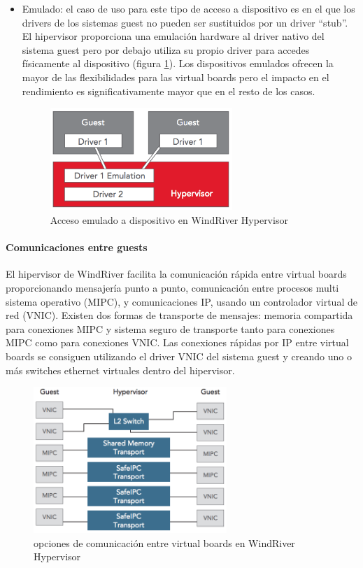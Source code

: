 \begin{itemize}
  \item Emulado: el caso de uso para este tipo de acceso a dispositivo es en el que los drivers de los sistemas guest no pueden ser sustituidos por un driver ``stub''. El hipervisor proporciona una emulación hardware al driver nativo del sistema guest pero por debajo utiliza su propio driver para accedes físicamente al dispositivo (figura \ref{fig:windriver_drv_3}). Los dispositivos emulados ofrecen la mayor de las flexibilidades para las virtual boards pero el impacto en el rendimiento es significativamente mayor que en el resto de los casos.
  \begin{figure}[!htb]
  	\centering
  	\includegraphics[width=0.65\textwidth]{recursos/windriver_drv_3.png}
  	\caption{Acceso emulado a dispositivo en WindRiver Hypervisor}
  	\label{fig:windriver_drv_3}
  \end{figure}

\end{itemize}

\paragraph{Comunicaciones entre guests}
El hipervisor de WindRiver facilita la comunicación rápida entre virtual boards proporcionando mensajería punto a punto, comunicación entre procesos multi sistema operativo (\acrshort{MIPC}), y comunicaciones IP, usando un controlador virtual de red (VNIC). Existen dos formas de transporte de mensajes: memoria compartida para conexiones \acrshort{MIPC} y sistema seguro de transporte tanto para conexiones \acrshort{MIPC} como para conexiones \acrshort{VNIC}. Las conexiones rápidas por IP entre virtual boards se consiguen utilizando el driver \acrshort{VNIC} del sistema guest y creando uno o más switches ethernet virtuales dentro del hipervisor.
\begin{figure}[!htb]
  \centering
  \includegraphics[width=0.65\textwidth]{recursos/windriver_com.png}
  \caption{opciones de comunicación entre virtual boards en WindRiver Hypervisor}
  \label{fig:windriver_com}
\end{figure}

